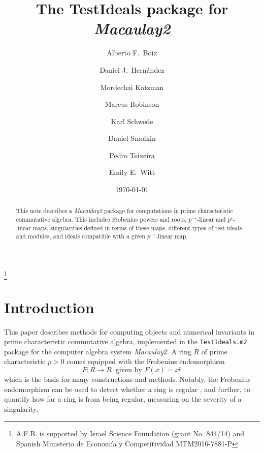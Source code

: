 \documentclass{amsart}
\begin{document}
\title{The  {TestIdeals} package for \emph{Macaulay2}}
\author[Alberto F.\ Boix et at.]{Alberto F.\ Boix}
\address{Department of Mathematics, Ben-Gurion University of the Negev, Beer-Sheva 8410501, ISRAEL}
\thanks{A.F.B. is supported by Israel Science Foundation (grant No. 844/14) and Spanish Ministerio de Econom\'ia y Competitividad MTM2016-7881-P}
\author[]{Daniel J.\ Hern\'andez}
\address{Department of Mathematics, University of Kansas, Lawrence, KS~66045, USA}
\author[]{Mordechai Katzman}
\author[]{Marcus Robinson}
\author[]{Karl Schwede}
\address{Department of Mathematics, University of Utah, Salt Lake City, UT~84112, USA}
\author[]{Daniel Smolkin}
\author[]{Pedro Teixeira}
\address{Department of Mathematics, Knox College, Galesburg, IL~61401, USA}
\author[]{Emily E.\ Witt}
\address{Department of Mathematics, University of Kansas, Lawrence, KS~66045, USA}
\date{\today}

\begin{abstract}
	This note describes a \emph{Macaulay2} package for computations in prime characteristic commutative algebra.  This includes Frobenius powers and roots, $p^{-e}$-linear and $p^{e}$-linear  maps,
  singularities defined in terms of these maps, different types of test ideals and modules, and ideals compatible with a given $p^{-e}$-linear map.
\end{abstract}




\maketitle

\section{Introduction}

This paper describes methods for computing objects and numerical invariants in prime characteristic commutative algebra, implemented in the \texttt{TestIdeals.m2} package for the computer algebra system \emph{Macaulay2}.
A ring $R$ of prime characteristic $p>0$ comes equipped with the Frobenius endomorphism
\[ F: R \to R \ \text{ given by } F(x) =  x^p \]
which is the basis for many constructions and methods.
Notably, the Frobenius endomorphism can be used to detect whether a ring is regular \cite{KunzCharacterizationsOfRegularLocalRings}, and further, to quantify how far a ring is from being regular, measuring on the severity of a singularity.
\end{document}
